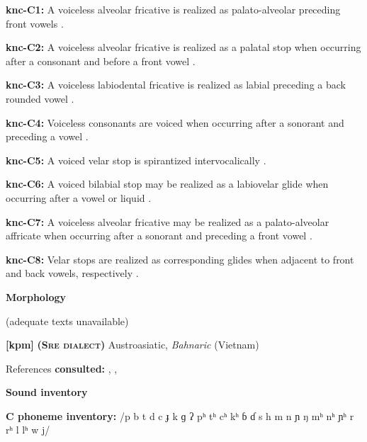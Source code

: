 \textbf{knc-C1:} A voiceless alveolar fricative is realized as palato-alveolar preceding front vowels \citep[20]{Cyffer1998}.



\textbf{knc-C2:} A voiceless alveolar fricative is realized as a palatal stop when occurring after a consonant and before a front vowel \citep[21]{Cyffer1998}.



\textbf{knc-C3:} A voiceless labiodental fricative is realized as labial preceding a back rounded vowel \citep[23]{Cyffer1998}.



\textbf{knc-C4:} Voiceless consonants are voiced when occurring after a sonorant and preceding a vowel \citep[22]{Cyffer1998}.



\textbf{knc-C5:} A voiced velar stop is spirantized intervocalically \citep[22]{Cyffer1998}.



\textbf{knc-C6:} A voiced bilabial stop may be realized as a labiovelar glide when occurring after a vowel or liquid \citep[22]{Cyffer1998}.



\textbf{knc-C7:} A voiceless alveolar fricative may be realized as a palato-alveolar affricate when occurring after a sonorant and preceding a front vowel \citep[21]{Cyffer1998}.



\textbf{knc-C8:} Velar stops are realized as corresponding glides when adjacent to front and back vowels, respectively \citep[22]{Cyffer1998}.



\textbf{Morphology}



(adequate texts unavailable)



\textbf{[kpm]}   \textbf{\textsc{ (Sre dialect)}}  Austroasiatic, \textit{Bahnaric} (Vietnam)



References \textbf{consulted:} \citet{LadefogedMaddieson1997}, \citet{Manley1972}, \citet{Olsen2014}



\textbf{Sound inventory}



\textbf{C phoneme inventory:} /p b t d c ɟ k ɡ ʔ pʰ tʰ cʰ kʰ ɓ ɗ s h m n ɲ ŋ mʰ nʰ ɲʰ r rʰ l lʰ w j/




